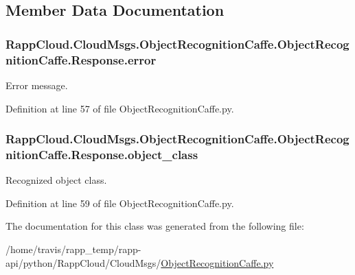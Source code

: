 \subsection{Member Data Documentation}
\hypertarget{classRappCloud_1_1CloudMsgs_1_1ObjectRecognitionCaffe_1_1ObjectRecognitionCaffe_1_1Response_ac787dd0dfb277934cb996a03704970af}{
\subsubsection[{error}]{\setlength{\rightskip}{0pt plus 5cm}Rapp\-Cloud.\-Cloud\-Msgs.\-Object\-Recognition\-Caffe.\-Object\-Recognition\-Caffe.\-Response.\-error}}\label{classRappCloud_1_1CloudMsgs_1_1ObjectRecognitionCaffe_1_1ObjectRecognitionCaffe_1_1Response_ac787dd0dfb277934cb996a03704970af}


Error message. 



Definition at line 57 of file Object\-Recognition\-Caffe.\-py.

\hypertarget{classRappCloud_1_1CloudMsgs_1_1ObjectRecognitionCaffe_1_1ObjectRecognitionCaffe_1_1Response_aa4cdc83276f00d365d3df48101dfbb20}{
\subsubsection[{object\-\_\-class}]{\setlength{\rightskip}{0pt plus 5cm}Rapp\-Cloud.\-Cloud\-Msgs.\-Object\-Recognition\-Caffe.\-Object\-Recognition\-Caffe.\-Response.\-object\-\_\-class}}\label{classRappCloud_1_1CloudMsgs_1_1ObjectRecognitionCaffe_1_1ObjectRecognitionCaffe_1_1Response_aa4cdc83276f00d365d3df48101dfbb20}


Recognized object class. 



Definition at line 59 of file Object\-Recognition\-Caffe.\-py.



The documentation for this class was generated from the following file\-:\begin{DoxyCompactItemize}
\item 
/home/travis/rapp\-\_\-temp/rapp-\/api/python/\-Rapp\-Cloud/\-Cloud\-Msgs/\hyperlink{ObjectRecognitionCaffe_8py}{Object\-Recognition\-Caffe.\-py}\end{DoxyCompactItemize}
